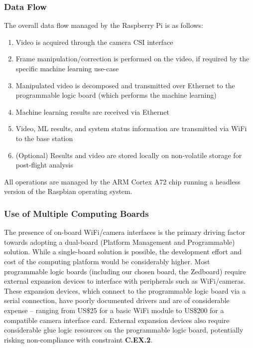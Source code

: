 \subsubsection{Data Flow}
The overall data flow managed by the Raspberry Pi is as follows:
\begin{enumerate}
\item Video is acquired through the camera CSI interface
\item Frame manipulation/correction is performed on the video, if required by the specific machine learning use-case
\item Manipulated video is decomposed and transmitted over Ethernet to the programmable logic board (which performs the machine learning)
\item Machine learning results are received via Ethernet
\item Video, ML results, and system status information are transmitted via WiFi to the base station
\item (Optional) Results and video are stored locally on non-volatile storage for post-flight analysis
\end{enumerate}

All operations are managed by the ARM Cortex A72 chip running a headless version of the Raspbian operating system. 

\subsubsection{Use of Multiple Computing Boards}
The presence of on-board WiFi/camera interfaces is the primary driving factor towards adopting a dual-board (Platform Management and Programmable) solution. While a single-board solution is possible, the development effort and cost of the computing platform would be considerably higher. Most programmable logic boards (including our chosen board, the Zedboard) require external expansion devices to interface with peripherals such as WiFi/cameras. These expansion devices, which connect to the programmable logic board via a serial connection, have poorly documented drivers and are of considerable expense -- ranging from US\$25 for a basic WiFi module\cite{digiwifi} to US\$200 for a compatible camera interface card\cite{digipmod}. External expansion devices also require considerable glue logic resources on the programmable logic board, potentially risking non-compliance with constraint \textbf{C.EX.2}.

